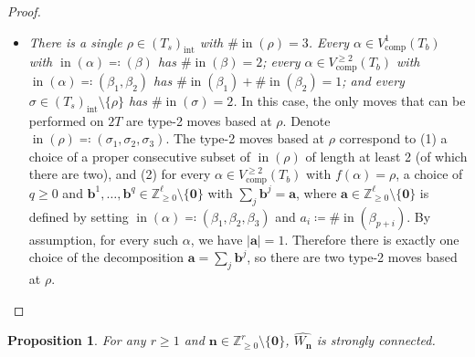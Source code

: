 \documentclass[11pt]{amsart}
\newtheorem{proposition}[theorem]{Proposition}
\theoremstyle{definition}
\theoremstyle{remark}
\theoremstyle{plain}
\newcommand{\bZ}{\mathbb{Z}}
\newcommand\ba{\mathbf{a}}
\newcommand\bb{\mathbf{b}}
\newcommand\bn{\mathbf{n}}
\newcommand\bzero{\mathbf{0}}
\newcommand{\on}{\operatorname}
\newcommand{\comp}{C^2}
\renewcommand{\comp}{{\on{comp}}}
\newcommand{\incom}{\on{in}}
\newcommand{\inte}{{\on{int}}}
\newcommand{\wh}{\widehat}
\begin{document}
\begin{proof}
\begin{itemize}
\item[] {\it There is a single $\rho \in (T_s)_\inte$ with $\#\!\incom(\rho)=3$.
Every $\alpha \in V_\comp^1(T_b)$ with $\incom(\alpha) \eqqcolon (\beta)$ has $\#\!\incom(\beta) = 2$; every $\alpha \in V_\comp^{\geq2}(T_b)$ with $\incom(\alpha) \eqqcolon (\beta_1,\beta_2)$ has $\#\!\incom(\beta_1)+\#\!\incom(\beta_2) = 1$; and every $\sigma \in (T_s)_\inte \setminus \{\rho\}$ has $\#\!\incom(\sigma) = 2$.} In this case, the only moves that can be performed on $2T$ are type-2 moves based at $\rho$.
Denote $\incom(\rho) \eqqcolon (\sigma_1,\sigma_2,\sigma_3)$.
The type-2 moves based at $\rho$ correspond to (1) a choice of a proper consecutive subset of $\incom(\rho)$ of length at least 2 (of which there are two), and (2) for every $\alpha \in V_\comp^{\geq2}(T_b)$ with $f(\alpha)=\rho$, a choice of $q\geq0$ and $\bb^1,\ldots,\bb^q \in \bZ_{\geq0}^\ell\setminus\{\bzero\}$ with $\sum_j \bb^j = \ba$, where $\ba \in \bZ_{\geq0}^\ell\setminus\{\bzero\}$ is defined by setting $\incom(\alpha) \eqqcolon (\beta_1,\beta_2,\beta_3)$ and $a_i \coloneqq \#\!\incom(\beta_{p+i})$.
By assumption, for every such $\alpha$, we have $|\ba|=1$.
Therefore there is exactly one choice of the decomposition $\ba = \sum_j \bb^j$, so there are two type-2 moves based at $\rho$.
\end{itemize}
\end{proof}

\begin{proposition}
\label{prop:Wn_conn}
For any $r \geq 1$ and $\bn \in \bZ^r_{\geq0}\setminus\{\bzero\}$, $\wh{W_\bn}$ is strongly connected.
\end{proposition}
\end{document}
